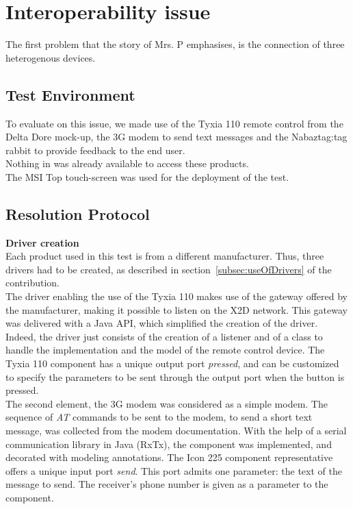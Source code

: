 \section{Interoperability issue}
\label{subsec:interop}

The first problem that the story of Mrs. P emphasises, is the connection of three heterogenous devices.

\subsection{Test Environment}
To evaluate \enti{} on this issue, we made use of the Tyxia 110 remote control from the Delta Dore mock-up, the 3G modem to send text messages and the Nabaztag:tag rabbit to provide feedback to the end user.\\
Nothing in \enti{} was already available to access these products.\\
The MSI Top touch-screen was used for the deployment of the test.

\subsection{Resolution Protocol}

{\bf Driver creation}\\
Each product used in this test is from a different manufacturer. Thus, three drivers had to be created, as described in section~\ref{subsec:useOfDrivers} of the contribution.\\

The driver enabling the use of the Tyxia 110 makes use of the gateway offered by the manufacturer, making it possible to listen on the X2D network. This gateway was delivered with a Java API, which simplified the creation of the driver. Indeed, the driver just consists of the creation of a listener and of a class to handle the implementation and the model of the remote control device. The Tyxia 110 component has a unique output port {\it pressed}, and can be customized to specify the parameters to be sent through the output port when the button is pressed.\\

The second element, the 3G modem was considered as a simple modem. The sequence of {\it AT} commands to be sent to the modem, to send a short text message, was collected from the modem documentation. With the help of a serial communication library in Java (RxTx), the component was implemented, and decorated with modeling annotations. The Icon 225 component representative offers a unique input port {\it send}. This port admits one parameter: the text of the message to send. The receiver's phone number is given as a parameter to the component.\\

